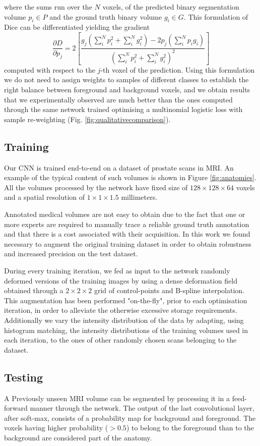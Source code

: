 \documentclass{llncs}
\begin{document}
where the sums run over the $N$ voxels, of the predicted binary segmentation volume $p_i\in{P}$ and the ground truth binary volume $g_i\in{G}$. This formulation of Dice can be differentiated yielding the gradient  
\[
\frac{\partial D}{\partial p_{j}}=2\left[\frac{g_{j}\left(\sum_{i}^{N}p_{i}^{2}+\sum_{i}^{N}g_{i}^{2}\right)-2p_{j}\left(\sum_{i}^{N}p_{i}g_{i}\right)}{\left(\sum_{i}^{N}p_{i}^{2}+\sum_{i}^{N}g_{i}^{2}\right)^{2}}\right]
\]
computed with respect to the $j$-th voxel of the prediction. Using this formulation we do not need to assign weights to samples of different classes to establish the right balance between foreground and background voxels, and we obtain results that we experimentally observed are much better than the ones computed through the same network trained optimising a multinomial logistic loss with sample re-weighting (Fig. \ref{fig:qualitativecomparison}). 

\subsection{Training}
Our CNN is trained end-to-end on a dataset of prostate scans in MRI. An example of the typical content of such volumes is shown in Figure \ref{fig:anatomies}. All the volumes processed by the network have fixed size of $128\times128\times64$ voxels and a spatial resolution of $1\times1\times1.5$ millimeters.

Annotated medical volumes are not easy to obtain due to the fact that one or more experts are required to manually trace a reliable ground truth annotation and that there is a cost associated with their acquisition. In this work we found necessary to augment the original training dataset in order to obtain robustness and increased precision on the test dataset. 

During every training iteration, we fed as input to the network randomly deformed versions of the training images by using a dense deformation field obtained through a $2\times2\times2$ grid of control-points and B-spline interpolation. This augmentation has been performed "on-the-fly", prior to each optimisation iteration, in order to alleviate the otherwise excessive storage requirements. Additionally we vary the intensity distribution of the data by adapting, using histogram matching, the intensity distributions of the training volumes used in each iteration, to the ones of other randomly chosen scans belonging to the dataset.

\subsection{Testing}
A Previously unseen MRI volume can be segmented by processing it in a feed-forward manner through the network. The output of the last convolutional layer, after soft-max, consists of a probability map for background and foreground. The voxels having higher probability ($>0.5$) to belong to the foreground than to the background are considered part of the anatomy.
 
\end{document}
